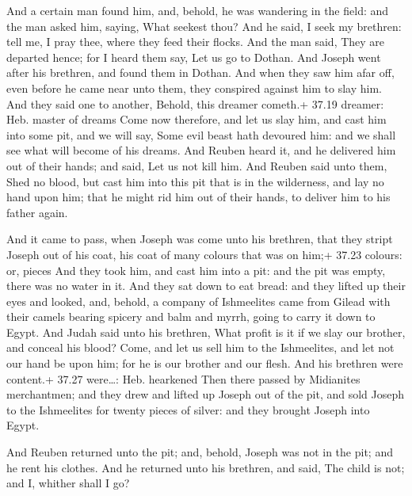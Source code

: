  And a certain man found him, and, behold, he was
wandering in the field: and the man asked him, saying, What seekest
thou?  And he said, I seek my brethren: tell me, I pray
thee, where they feed their flocks.  And the man said, They
are departed hence; for I heard them say, Let us go to Dothan. And
Joseph went after his brethren, and found them in Dothan. 
And when they saw him afar off, even before he came near unto them, they
conspired against him to slay him.  And they said one to
another, Behold, this dreamer cometh.+ 37.19 dreamer: Heb. master of
dreams  Come now therefore, and let us slay him, and cast
him into some pit, and we will say, Some evil beast hath devoured him:
and we shall see what will become of his dreams.  And
Reuben heard it, and he delivered him out of their hands; and said, Let
us not kill him.  And Reuben said unto them, Shed no blood,
but cast him into this pit that is in the wilderness, and lay no hand
upon him; that he might rid him out of their hands, to deliver him to
his father again.

 And it came to pass, when Joseph was come unto his
brethren, that they stript Joseph out of his coat, his coat of many
colours that was on him;+ 37.23 colours: or, pieces  And
they took him, and cast him into a pit: and the pit was empty, there was
no water in it.  And they sat down to eat bread: and they
lifted up their eyes and looked, and, behold, a company of Ishmeelites
came from Gilead with their camels bearing spicery and balm and myrrh,
going to carry it down to Egypt.  And Judah said unto his
brethren, What profit is it if we slay our brother, and conceal his
blood?  Come, and let us sell him to the Ishmeelites, and
let not our hand be upon him; for he is our brother and our flesh. And
his brethren were content.+ 37.27 were\ldots: Heb. hearkened
 Then there passed by Midianites merchantmen; and they drew
and lifted up Joseph out of the pit, and sold Joseph to the Ishmeelites
for twenty pieces of silver: and they brought Joseph into Egypt.

 And Reuben returned unto the pit; and, behold, Joseph
was not in the pit; and he rent his clothes.  And he
returned unto his brethren, and said, The child is not; and I, whither
shall I go?


